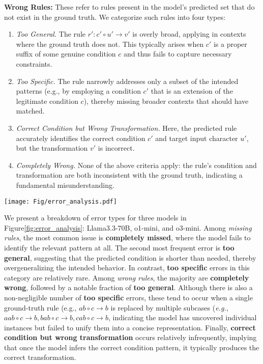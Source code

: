 \textbf{Wrong Rules:}  
These refer to rules present in the model's predicted set that do not exist in the ground truth. We categorize such rules into four types:
\begin{enumerate}
    \item \emph{Too General.} The rule \(r': c' \circ u' \to v'\) is overly broad, applying in contexts where the ground truth does not. This typically arises when \(c'\) is a proper suffix of some genuine condition \(c\) and thus fails to capture necessary constraints.  
    \item \emph{Too Specific.} The rule narrowly addresses only a subset of the intended patterns (e.g., by employing a condition \(c'\) that is an extension of the legitimate condition \(c\)), thereby missing broader contexts that should have matched.  
    \item \emph{Correct Condition but Wrong Transformation.} Here, the predicted rule accurately identifies the correct condition \(c'\) and target input character \(u'\), but the transformation \(v'\) is incorrect.  
    \item \emph{Completely Wrong.} None of the above criteria apply: the rule's condition and transformation are both inconsistent with the ground truth, indicating a fundamental misunderstanding.
\end{enumerate}


\begin{figure*}[!ht]
    \centering
    \texttt{[image: Fig/error\_analysis.pdf]}
    \caption{Error Type Analysis}
    \label{fig:error_analysis}
\end{figure*}

We present a breakdown of error types for three models in Figure\ref{fig:error_analysis}: Llama3.3-70B, o1-mini, and o3-mini. Among \emph{missing rules}, the most common issue is \textbf{completely missed}, where the model fails to identify the relevant pattern at all. The second most frequent error is \textbf{too general}, suggesting that the predicted condition is shorter than needed, thereby overgeneralizing the intended behavior. In contrast, \textbf{too specific} errors in this category are relatively rare. Among \emph{wrong rules}, the majority are \textbf{completely wrong}, followed by a notable fraction of \textbf{too general}. Although there is also a non-negligible number of \textbf{too specific} errors, these tend to occur when a single ground-truth rule (e.g., $ab\circ c\to b$ is replaced by multiple subcases (\emph{e.g.}, $aab\circ c\to b, bab\circ c\to b, cab\circ c\to b$, indicating the model has uncovered individual instances but failed to unify them into a concise representation. Finally, \textbf{correct condition but wrong transformation} occurs relatively infrequently, implying that once the model infers the correct condition pattern, it typically produces the correct transformation.

